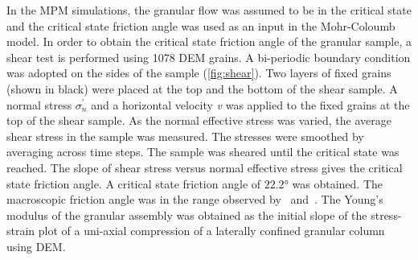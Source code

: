 In the MPM simulations, the granular flow was assumed to be in the critical 
state and the critical state friction angle was used as an input in the 
Mohr-Coloumb model. In order to obtain the critical state friction angle of the 
granular sample, a shear test is performed using 1078 DEM grains. A 
bi-periodic boundary condition was adopted on the sides of the sample 
(\cref{fig:shear}). Two layers of fixed grains (shown in black) were placed at 
the top and the bottom of the shear sample. A normal stress $\sigma_n^\prime$ 
and a horizontal velocity \textit{v} was applied to the fixed grains at the top 
of the shear sample. As the normal effective stress was varied, the average 
shear stress in the sample was measured. The stresses were smoothed by 
averaging across time steps. The sample was sheared until the critical state 
was reached. The slope of shear stress versus normal effective stress gives the 
critical state friction angle. A critical state friction angle of 
$22.2$\si{\degree} was obtained. The macroscopic friction angle was in the 
range observed by~\citet{Estrada2008} and~\citet{Mitchell2005}. The Young's 
modulus of the granular assembly was obtained as the initial slope of the 
stress-strain plot of a uni-axial compression of a laterally confined granular 
column using DEM.

